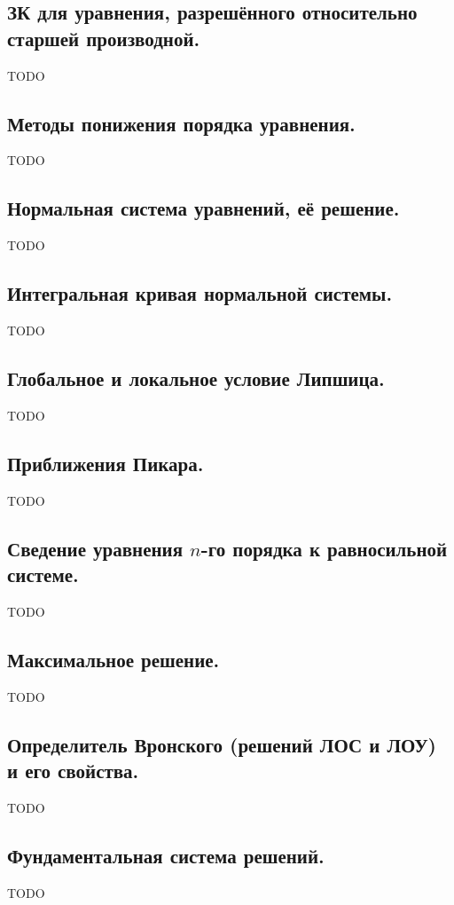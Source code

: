 \documentclass{article}
\begin{document}
\subsection{ЗК для уравнения, разрешённого относительно старшей производной.}
TODO

\subsection{Методы понижения порядка уравнения.}
TODO

\subsection{Нормальная система уравнений, её решение.}
TODO

\subsection{Интегральная кривая нормальной системы.}
TODO

\subsection{Глобальное и локальное условие Липшица.}
TODO

\subsection{Приближения Пикара.}
TODO

\subsection{Сведение уравнения $n$-го порядка к равносильной системе.}
TODO

\subsection{Максимальное решение.}
TODO

\subsection{Определитель Вронского (решений ЛОС и ЛОУ) и его свойства.}
TODO

\subsection{Фундаментальная система решений.}
TODO
\end{document}
